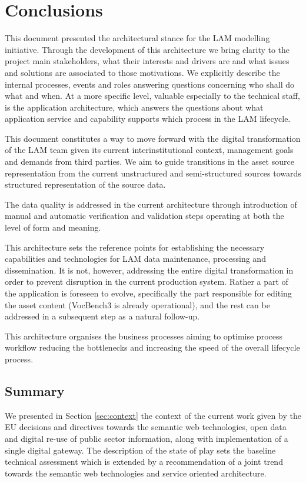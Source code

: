 \chapter{Conclusions}
\label{sec:conclusions}
	
	This document presented the architectural stance for the LAM modelling initiative. Through the development of this architecture we bring clarity to the project main stakeholders, what their interests and drivers are and what issues and solutions are associated to those motivations. We explicitly describe the internal processes, events and roles answering questions concerning who shall do what and when. At a more specific level, valuable especially to the technical staff, is the application architecture, which answers the questions about what application service and capability supports which process in the LAM lifecycle. 
	
	This document constitutes a way to move forward with the digital transformation of the LAM team given its current interinstitutional context, management goals and demands from third parties. We aim to guide transitions in the asset source representation from the current unstructured and semi-structured sources towards structured representation of the source data. 
	
    The data quality is addressed in the current architecture through introduction of manual and automatic verification and validation steps operating at both the level of form and meaning.
    
    This architecture sets the reference points for establishing the necessary capabilities and technologies for LAM data maintenance, processing and dissemination. It is not, however, addressing the entire digital transformation in order to prevent disruption in the current production system. Rather a part of the application is foreseen to evolve, specifically the part responsible for editing the asset content (VocBench3 is already operational), and the rest can be addressed in a subsequent step as a natural follow-up. 
	
	This architecture organises the business processes aiming to optimise process workflow reducing the bottlenecks and increasing the speed of the overall lifecycle process.  

	\section{Summary}
	We presented in Section \ref{sec:context} the context of the current work given by the EU decisions and directives towards the semantic web technologies, open data and digital re-use of public sector information, along with implementation of a single digital gateway. The description of the state of play sets the baseline technical assessment which is extended by a recommendation of a joint trend towards the semantic web technologies and service oriented architecture.
	
